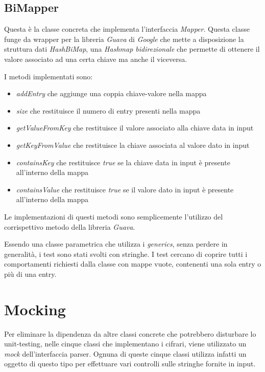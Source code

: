 		\subsection{BiMapper}
				Questa è la classe concreta che implementa l'interfaccia \emph{Mapper}. Questa classe funge da wrapper per la libreria \emph{Guava} di \emph{Google} che mette a disposizione la struttura dati \emph{HashBiMap}, una \emph{Hashmap bidirezionale} che permette di ottenere il valore associato ad una certa chiave ma anche il viceversa.
				
				I metodi implementati sono:
				\begin{itemize}
					\item \emph{addEntry} che aggiunge una coppia chiave-valore nella mappa
					\item \emph{size} che restituisce il numero di entry presenti nella mappa
					\item \emph{getValueFromKey} che restituisce il valore associato alla chiave data in input
					\item \emph{getKeyFromValue} che restituisce la chiave associata al valore dato in input
					\item \emph{containsKey} che restituisce \emph{true} se la chiave data in input è presente all'interno della mappa
					\item \emph{containsValue} che restituisce \emph{true} se il valore dato in input è presente all'interno della mappa
				\end{itemize}
				
				Le implementazioni di questi metodi sono semplicemente l'utilizzo del corrispettivo metodo della libreria \emph{Guava}. 
				
				Essendo una classe parametrica che utilizza i \emph{generics}, senza perdere in generalità, i test sono stati svolti con stringhe. I test cercano di coprire tutti i comportamenti richiesti dalla classe con mappe vuote, contenenti una sola entry o più di una entry.
			
	\section{Mocking}
		Per eliminare la dipendenza da altre classi concrete che potrebbero disturbare lo unit-testing, nelle cinque classi che implementano i cifrari, viene utilizzato un \emph{mock} dell'interfaccia parser.	Ognuna di queste cinque classi utilizza infatti un oggetto di questo tipo per effettuare vari controlli sulle stringhe fornite in input.
		
